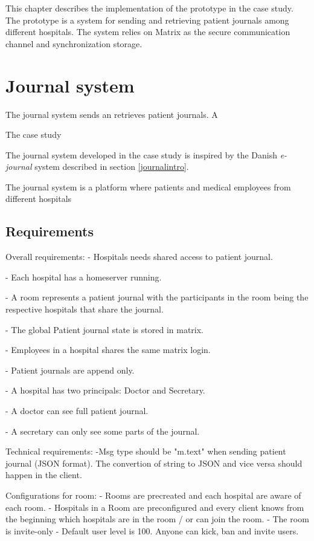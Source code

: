 This chapter describes the implementation of the prototype in the case study. The prototype is a system for sending and retrieving patient journals among different hospitals. The system relies on Matrix as the secure communication channel and synchronization storage.

\section{Journal system}


The journal system sends an retrieves patient journals. A



The case study 

The journal system developed in the case study is inspired by the Danish \emph{e-journal} system described in section \ref{journalintro}. 

The journal system is a platform where patients and medical employees from different hospitals

\subsection{Requirements}

Overall requirements:
- Hospitals needs shared access to patient journal. 

- Each hospital has a homeserver running.

- A room represents a patient journal with the participants in the room being the respective hospitals that share the journal. 

- The global Patient journal state is stored in matrix.

- Employees in a hospital shares the same matrix login.

- Patient journals are append only.

- A hospital has two principals: Doctor and Secretary.

- A doctor can see full patient journal.

- A secretary can only see some parts of the journal.


Technical requirements:
-Msg type should be "m.text" when sending patient journal (JSON format). The convertion of string to JSON and vice versa should happen in the client.


Configurations for room:
- Rooms are precreated and each hospital are aware of each room. 
- Hospitals in a Room are preconfigured and every client knows from the beginning which hospitals are in the room / or can join the room.
- The room is invite-only
- Default user level is 100. Anyone can kick, ban and invite users. 

